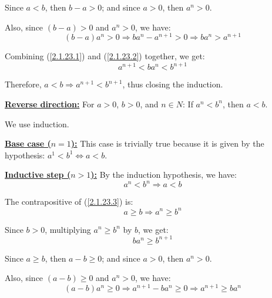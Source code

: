 \documentclass{article}
\begin{document}
\noindent
Since $a<b$, then $b-a>0$; and since $a>0$, then $a^n>0$.

\noindent
Also, since $(b-a)>0$ and $a^n>0$, we have: 
\begin{equation}
  (b-a)a^n > 0 \Rightarrow ba^n - a^{n+1} > 0 \Rightarrow ba^n > a^{n+1} \label{2.1.23.2}
\end{equation}

\noindent
Combining (\ref{2.1.23.1}) and (\ref{2.1.23.2}) together, we get:
\begin{equation*}
  a^{n+1} < ba^n < b^{n+1}
\end{equation*}

\noindent
Therefore, $a<b \Rightarrow a^{n+1} < b^{n+1}$, thus closing the induction.
\newline

\noindent
\textbf{\underline{Reverse direction:}} For $a>0$, $b>0$, and $n \in N$: If $a^n<b^n$, then $a<b$.
\newline

\noindent
We use induction.
\newline

\noindent
\textbf{\underline{Base case ($n=1$):}} This case is trivially true because it is given by the hypothesis: $a^1<b^1 \iff a < b$.
\newline

\noindent
\textbf{\underline{Inductive step ($n>1$):}} By the induction hypothesis, we have: 
\begin{equation}
  a^n<b^n \Rightarrow a < b \label{2.1.23.3}
\end{equation}

\noindent
The contrapositive of (\ref{2.1.23.3}) is:
\begin{equation}
  a \geq b \Rightarrow a^n \geq b^n \label{2.1.23.4}
\end{equation}

\noindent
Since $b>0$, multiplying $a^n \geq b^n$ by $b$, we get:
\begin{equation}
  ba^n \geq b^{n+1} \label{2.1.23.5}
\end{equation}

\noindent
Since $a \geq b$, then $a-b \geq 0$; and since $a>0$, then $a^n>0$.

\noindent
Also, since $(a-b) \geq 0$ and $a^n>0$, we have: 
\begin{equation}
  (a-b)a^n \geq 0 \Rightarrow a^{n+1} - ba^n \geq 0 \Rightarrow a^{n+1} \geq ba^n \label{2.1.23.6}
\end{equation}
\end{document}
